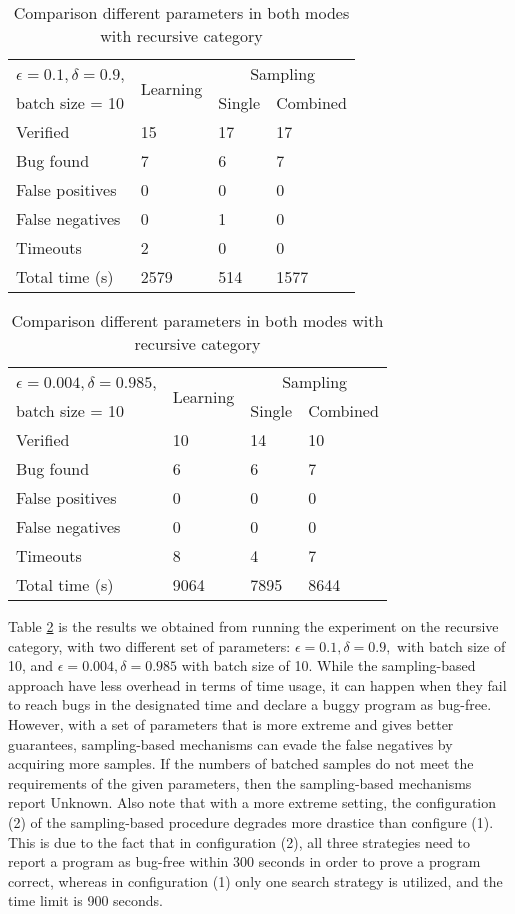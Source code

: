 \begin{table}[h]
	\centering
	\caption{Comparison different parameters in both modes with recursive category}
	\label{table:compare_param_recursive}
	\begin{tabular}{|l|l|l|l|}
		\hline
		$\epsilon = 0.1, \delta = 0.9$, & \multirow{2}{*}{Learning} & \multicolumn{2}{c|}{Sampling} \\
		\cline{3-4}
		batch size = 10 & & Single & Combined \\
		\hline
		Verified & 15 & 17 & 17 \\
		Bug found & 7 & 6 & 7 \\
		\hline
		False positives & 0 & 0 & 0 \\
		False negatives & 0 & 1 & 0 \\
		Timeouts & 2 & 0 & 0 \\
		\hline
		Total time (s) & 2579 & 514 & 1577 \\
		\hline
	\end{tabular}
	
	\bigskip
	
	\begin{tabular}{|l|l|l|l|}
		\hline
		$\epsilon = 0.004, \delta = 0.985$, & \multirow{2}{*}{Learning} & \multicolumn{2}{c|}{Sampling} \\
		\cline{3-4}
		batch size = 10 & & Single & Combined \\
		\hline
		Verified & 10 & 14 & 10 \\
		Bug found & 6 & 6 & 7 \\
		\hline
		False positives & 0 & 0 & 0 \\
		False negatives & 0 & 0 & 0 \\
		Timeouts & 8 & 4 & 7 \\
		\hline
		Total time (s) & 9064 & 7895 & 8644 \\
		\hline
	\end{tabular}
\end{table}

\clearpage
Table \ref{table:compare_param_recursive} is the results we obtained from running the experiment on the recursive category, with two different set of parameters: $\epsilon = 0.1, \delta = 0.9,$ with batch size of 10, and $\epsilon = 0.004, \delta = 0.985$ with batch size of 10. While the sampling-based approach have less overhead in terms of time usage, it can happen when they fail to reach bugs in the designated time and declare a buggy program as bug-free. However, with a set of parameters that is more extreme and gives better guarantees, sampling-based mechanisms can evade the false negatives by acquiring more samples. If the numbers of batched samples do not meet the requirements of the given parameters, then the sampling-based mechanisms report Unknown. Also note that with a more extreme setting, the configuration (2) of the sampling-based procedure degrades more drastice than configure (1). This is due to the fact that in configuration (2), all three strategies need to report a program as bug-free within 300 seconds in order to prove a program correct, whereas in configuration (1) only one search strategy is utilized, and the time limit is 900 seconds. 

